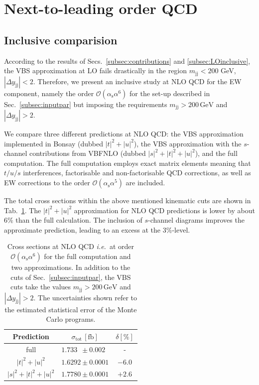 \documentclass[twocolumn,epjc3]{svjour3} %
\newcommand{\Pj}{\ensuremath{\text{j}}\xspace}
\newcommand{\GeV}{\ensuremath{\,\text{GeV}}\xspace}
\newcommand{\alphas}{\ensuremath{\alpha_\text{s}}\xspace}
\begin{document}
\section{Next-to-leading order QCD}
    \label{sec:NLO}
    \subsection{Inclusive comparision}
        \label{subsec:NLOinclusive}
    According to the results of Secs.~\ref{subsec:contributions} and \ref{subsec:LOinclusive}, the VBS approximation at LO fails drastically in the region $m_{\Pj\Pj} < 200$ GeV, $|\Delta y_{\Pj\Pj}| < 2$.
    Therefore, we present an inclusive study at NLO QCD for the EW component, namely the order $\mathcal{O}(\alphas\alpha^6)$ for the set-up described in Sec.~\ref{subsec:inputpar} but imposing the requirements $m_{\Pj\Pj}>200 \GeV$ and $|\Delta y_{\Pj\Pj}|>2$.

    We compare three different predictions at NLO QCD: 
    the VBS approximation implemented in {\sc Bonsay} (dubbed $|t|^2+|u|^2$), the VBS approximation with the $s$-channel contributions from {\sc VBFNLO} (dubbed $|s|^2+|t|^2+|u|^2$), and the full computation.
    The full computation employs exact matrix elements meaning that $t/u/s$ interferences, factorisable and non-factorisable QCD corrections, as well as EW corrections to the order $\mathcal{O}(\alphas \alpha^5)$ are included.

    The total cross sections within the above mentioned kinematic cuts are shown in Tab.~\ref{tab:crosssecINCLUSIVE}.
    The $|t|^2+|u|^2$ approximation for NLO QCD predictions is lower by about $6\%$ than the full calculation.
    The inclusion of $s$-channel diagrams improves the approximate prediction, leading to an excess at the $3\%$-level.

    \begin{table}[h!]
    \centering
    \begin{tabular}{c|c|c}
    Prediction & $\sigma_{\textrm{tot}}\,[\textrm{fb}]$ & $\delta [\%]$ \\
    \hline
    \hline
    full &  $1.733\phantom{0} \pm 0.002\phantom{0}$ & - \\
    \hline
    $|t|^2 + |u|^2$ & $1.6292 \pm 0.0001$  &  $-6.0$ \\
    \hline
    $|s|^2 + |t|^2 + |u|^2$ & $1.7780 \pm 0.0001$  & $+2.6$
    \end{tabular}
    \caption{Cross sections at NLO QCD \emph{i.e.}\ at order $\mathcal{O}(\alphas\alpha^6)$ for the full computation and two approximations.
    In addition to the cuts of Sec.~\protect\ref{subsec:inputpar}, the VBS cuts take the values $m_{\Pj\Pj}>200 \GeV$ and $|\Delta y_{\Pj\Pj}|>2$.
    The uncertainties shown refer to the estimated statistical error of the Monte Carlo programs.}
    \label{tab:crosssecINCLUSIVE}
    \end{table}
\end{document}
